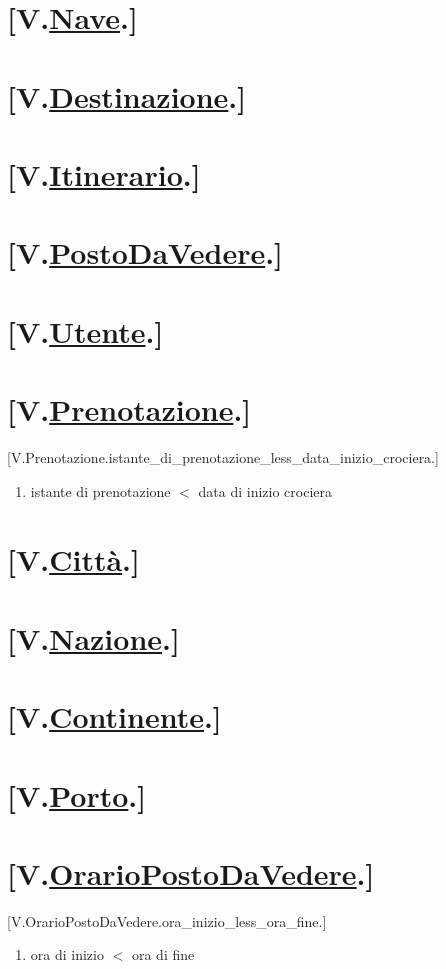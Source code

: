\documentclass{article}
\begin{document}
\section*{[V.\hyperref[sec:Nave]{Nave}.]}
\section*{[V.\hyperref[sec:Destinazione]{Destinazione}.]}
\section*{[V.\hyperref[sec:Itinerario]{Itinerario}.]}
\section*{[V.\hyperref[sec:PostoDaVedere]{PostoDaVedere}.]}
\section*{[V.\hyperref[sec:Utente]{Utente}.]}
\section*{[V.\hyperref[sec:Prenotazione]{Prenotazione}.]}
    [V.Prenotazione.istante\_di\_prenotazione\_less\_data\_inizio\_crociera.]
    \begin{enumerate}
        \item istante di prenotazione $<$ data di inizio crociera
    \end{enumerate}
\section*{[V.\hyperref[sec:Città]{Città}.]}
\section*{[V.\hyperref[sec:Nazione]{Nazione}.]}
\section*{[V.\hyperref[sec:Continente]{Continente}.]}
\section*{[V.\hyperref[sec:Porto]{Porto}.]}
\section*{[V.\hyperref[sec:OrarioPostoDaVedere]{OrarioPostoDaVedere}.]}
    [V.OrarioPostoDaVedere.ora\_inizio\_less\_ora\_fine.]
    \begin{enumerate}
        \item ora di inizio $<$ ora di fine
    \end{enumerate}
\end{document}
